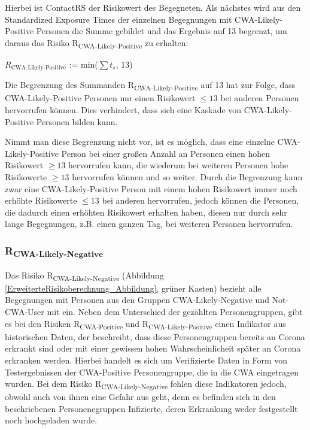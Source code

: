 \documentclass[conference,compsoc]{IEEEtran}
\begin{document}
Hierbei ist ContactRS der Risikowert des Begegneten.
Als nächstes wird aus den Standardized Exposure Times der einzelnen Begegnungen mit CWA-Likely-Positive Personen die Summe gebildet und das Ergebnis auf 13 begrenzt, 
um daraus das Risiko R\textsubscript{CWA-Likely-Positive} zu erhalten:

\centerline{\text{ }}
\centerline{$R_{\text{CWA-Likely-Positive}}$ := min($\sum t_s$, 13)}
\centerline{\text{ }}

Die Begrenzung des Summanden R\textsubscript{CWA-Likely-Positive} auf 13 hat zur Folge, 
dass CWA-Likely-Positive Personen nur einen Risikowert $\le 13$ bei anderen Personen hervorrufen können. 
Dies verhindert, dass sich eine Kaskade von CWA-Likely-Positive Personen bilden kann. 

Nimmt man diese Begrenzung nicht vor, 
ist es möglich, dass eine einzelne CWA-Likely-Positive Person bei einer großen Anzahl an Personen einen hohen Risikowert $\geq 13$ hervorrufen kann, 
die wiederum bei weiteren Personen hohe Risikowerte $\geq 13$ hervorrufen können und so weiter. 
Durch die Begrenzung kann zwar eine CWA-Likely-Positive Person mit einem hohen Risikowert immer noch erhöhte Risikowerte $\leq 13$ bei anderen hervorrufen, 
jedoch können die Personen, die dadurch einen erhöhten Risikowert erhalten haben, diesen nur durch sehr lange Begegnungen, z.B. einen ganzen Tag, bei weiteren Personen hervorrufen.\\

\subsubsection{R\textsubscript{CWA-Likely-Negative}}
\label{CWALikelyNegative}

Das Risiko R\textsubscript{CWA-Likely-Negative} (Abbildung \ref{ErweiterteRisikoberechnung_Abbildung}, grüner Kasten) 
bezieht alle Begegnungen mit Personen aus den Gruppen CWA-Likely-Negative und Not-CWA-User mit ein.
Neben dem Unterschied der gezählten Personengruppen, gibt es bei den  Risiken R\textsubscript{CWA-Positive} und 
R\textsubscript{CWA-Likely-Positive} einen Indikator aus historischen Daten, 
der beschreibt, dass diese Personengruppen bereits an Corona erkrankt sind oder mit einer gewissen hohen Wahrscheinlicheit später an Corona erkranken werden. 
Hierbei handelt es sich um Verifizierte Daten in Form von Testergebnissen der CWA-Positive Personengruppe, die in die CWA eingetragen wurden.
Bei dem Risiko R\textsubscript{CWA-Likely-Negative} fehlen diese Indikatoren jedoch, obwohl auch von ihnen eine Gefahr aus geht,
denn es befinden sich in den beschriebenen Personenegruppen Infizierte, deren Erkrankung weder festgestellt noch hochgeladen wurde.
\end{document}
